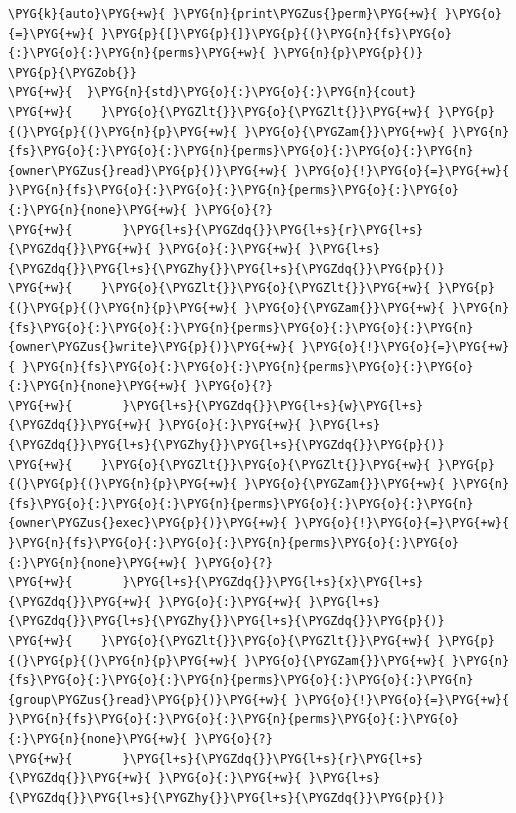 \begin{itemize}
\begin{codeblockbg}
\begin{Verbatim}[commandchars=\\\{\},breaklines=true,breakanywhere=true,fontsize=\codefont,xleftmargin=17bp]
\PYG{k}{auto}\PYG{+w}{ }\PYG{n}{print\PYGZus{}perm}\PYG{+w}{ }\PYG{o}{=}\PYG{+w}{ }\PYG{p}{[}\PYG{p}{]}\PYG{p}{(}\PYG{n}{fs}\PYG{o}{:}\PYG{o}{:}\PYG{n}{perms}\PYG{+w}{ }\PYG{n}{p}\PYG{p}{)}
\PYG{p}{\PYGZob{}}
\PYG{+w}{  }\PYG{n}{std}\PYG{o}{:}\PYG{o}{:}\PYG{n}{cout}
\PYG{+w}{    }\PYG{o}{\PYGZlt{}}\PYG{o}{\PYGZlt{}}\PYG{+w}{ }\PYG{p}{(}\PYG{p}{(}\PYG{n}{p}\PYG{+w}{ }\PYG{o}{\PYGZam{}}\PYG{+w}{ }\PYG{n}{fs}\PYG{o}{:}\PYG{o}{:}\PYG{n}{perms}\PYG{o}{:}\PYG{o}{:}\PYG{n}{owner\PYGZus{}read}\PYG{p}{)}\PYG{+w}{ }\PYG{o}{!}\PYG{o}{=}\PYG{+w}{ }\PYG{n}{fs}\PYG{o}{:}\PYG{o}{:}\PYG{n}{perms}\PYG{o}{:}\PYG{o}{:}\PYG{n}{none}\PYG{+w}{ }\PYG{o}{?}
\PYG{+w}{       }\PYG{l+s}{\PYGZdq{}}\PYG{l+s}{r}\PYG{l+s}{\PYGZdq{}}\PYG{+w}{ }\PYG{o}{:}\PYG{+w}{ }\PYG{l+s}{\PYGZdq{}}\PYG{l+s}{\PYGZhy{}}\PYG{l+s}{\PYGZdq{}}\PYG{p}{)}
\PYG{+w}{    }\PYG{o}{\PYGZlt{}}\PYG{o}{\PYGZlt{}}\PYG{+w}{ }\PYG{p}{(}\PYG{p}{(}\PYG{n}{p}\PYG{+w}{ }\PYG{o}{\PYGZam{}}\PYG{+w}{ }\PYG{n}{fs}\PYG{o}{:}\PYG{o}{:}\PYG{n}{perms}\PYG{o}{:}\PYG{o}{:}\PYG{n}{owner\PYGZus{}write}\PYG{p}{)}\PYG{+w}{ }\PYG{o}{!}\PYG{o}{=}\PYG{+w}{ }\PYG{n}{fs}\PYG{o}{:}\PYG{o}{:}\PYG{n}{perms}\PYG{o}{:}\PYG{o}{:}\PYG{n}{none}\PYG{+w}{ }\PYG{o}{?}
\PYG{+w}{       }\PYG{l+s}{\PYGZdq{}}\PYG{l+s}{w}\PYG{l+s}{\PYGZdq{}}\PYG{+w}{ }\PYG{o}{:}\PYG{+w}{ }\PYG{l+s}{\PYGZdq{}}\PYG{l+s}{\PYGZhy{}}\PYG{l+s}{\PYGZdq{}}\PYG{p}{)}
\PYG{+w}{    }\PYG{o}{\PYGZlt{}}\PYG{o}{\PYGZlt{}}\PYG{+w}{ }\PYG{p}{(}\PYG{p}{(}\PYG{n}{p}\PYG{+w}{ }\PYG{o}{\PYGZam{}}\PYG{+w}{ }\PYG{n}{fs}\PYG{o}{:}\PYG{o}{:}\PYG{n}{perms}\PYG{o}{:}\PYG{o}{:}\PYG{n}{owner\PYGZus{}exec}\PYG{p}{)}\PYG{+w}{ }\PYG{o}{!}\PYG{o}{=}\PYG{+w}{ }\PYG{n}{fs}\PYG{o}{:}\PYG{o}{:}\PYG{n}{perms}\PYG{o}{:}\PYG{o}{:}\PYG{n}{none}\PYG{+w}{ }\PYG{o}{?}
\PYG{+w}{       }\PYG{l+s}{\PYGZdq{}}\PYG{l+s}{x}\PYG{l+s}{\PYGZdq{}}\PYG{+w}{ }\PYG{o}{:}\PYG{+w}{ }\PYG{l+s}{\PYGZdq{}}\PYG{l+s}{\PYGZhy{}}\PYG{l+s}{\PYGZdq{}}\PYG{p}{)}
\PYG{+w}{    }\PYG{o}{\PYGZlt{}}\PYG{o}{\PYGZlt{}}\PYG{+w}{ }\PYG{p}{(}\PYG{p}{(}\PYG{n}{p}\PYG{+w}{ }\PYG{o}{\PYGZam{}}\PYG{+w}{ }\PYG{n}{fs}\PYG{o}{:}\PYG{o}{:}\PYG{n}{perms}\PYG{o}{:}\PYG{o}{:}\PYG{n}{group\PYGZus{}read}\PYG{p}{)}\PYG{+w}{ }\PYG{o}{!}\PYG{o}{=}\PYG{+w}{ }\PYG{n}{fs}\PYG{o}{:}\PYG{o}{:}\PYG{n}{perms}\PYG{o}{:}\PYG{o}{:}\PYG{n}{none}\PYG{+w}{ }\PYG{o}{?}
\PYG{+w}{       }\PYG{l+s}{\PYGZdq{}}\PYG{l+s}{r}\PYG{l+s}{\PYGZdq{}}\PYG{+w}{ }\PYG{o}{:}\PYG{+w}{ }\PYG{l+s}{\PYGZdq{}}\PYG{l+s}{\PYGZhy{}}\PYG{l+s}{\PYGZdq{}}\PYG{p}{)}

\end{Verbatim}
\end{codeblockbg}
\end{itemize}

